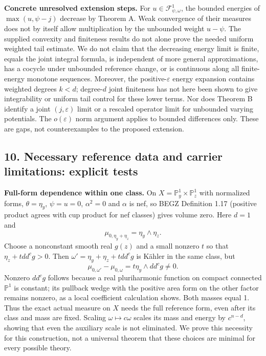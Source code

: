 \documentclass[
  10pt,
]{article}
\begin{document}
\textbf{Concrete unresolved extension steps.} For
\(u\in\mathcal{F}^1_{\psi,\omega}\), the bounded energies of
\(\max(u,\psi-j)\) decrease by Theorem A. Weak convergence of their
measures does not by itself allow multiplication by the unbounded weight
\(u-\psi\). The supplied convexity and finiteness results do not alone
prove the needed uniform weighted tail estimate. We do not claim that
the decreasing energy limit is finite, equals the joint integral
formula, is independent of more general approximations, has a cocycle
under unbounded reference change, or is continuous along all
finite-energy monotone sequences. Moreover, the positive-\(\varepsilon\)
energy expansion contains weighted degrees \(k<d\); degree-\(d\) joint
finiteness has not here been shown to give integrability or uniform tail
control for these lower terms. Nor does Theorem B identify a joint
\((j,\varepsilon)\) limit or a rescaled operator limit for unbounded
varying potentials. The \(o(\varepsilon)\) norm argument applies to
bounded differences only. These are gaps, not counterexamples to the
proposed extension.

\subsection{10. Necessary reference data and carrier limitations:
explicit
tests}\label{necessary-reference-data-and-carrier-limitations-explicit-tests}

\textbf{Full-form dependence within one class.} On
\(X=\mathbb{P}^1_y\times\mathbb{P}^1_z\) with normalized forms,
\(\theta=\eta_y\), \(\psi=u=0\), \(\alpha^2=0\) and \(\alpha\) is nef,
so BEGZ Definition 1.17 (positive product agrees with cup product for
nef classes) gives volume zero. Here \(d=1\) and \[
\mu_{0,\eta_y+\eta_z}=\eta_y\wedge\eta_z.
\] Choose a nonconstant smooth real \(g(z)\) and a small nonzero \(t\)
so that \(\eta_z+tdd^cg>0\). Then \(\omega'=\eta_y+\eta_z+tdd^cg\) is
Kähler in the same class, but \[
\mu_{0,\omega'}-\mu_{0,\omega}=t\eta_y\wedge dd^cg\neq0.
\] Nonzero \(dd^cg\) follows because a real pluriharmonic function on
compact connected \(\mathbb{P}^1\) is constant; its pullback wedge with
the positive area form on the other factor remains nonzero, as a local
coefficient calculation shows. Both masses equal 1. Thus the exact
actual measure on \(X\) needs the full reference form, even after its
class and mass are fixed. Scaling \(\omega\mapsto c\omega\) scales its
mass and energy by \(c^{n-d}\), showing that even the auxiliary scale is
not eliminated. We prove this necessity for this construction, not a
universal theorem that these choices are minimal for every possible
theory.
\end{document}
